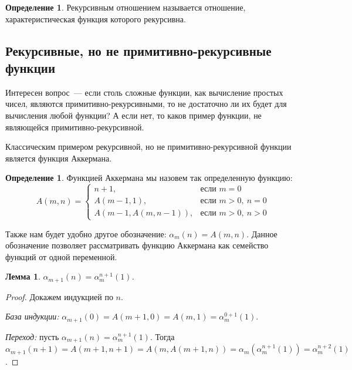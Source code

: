 \documentclass[a4paper,11pt]{article}
\newtheorem{lmm}[thm]{Лемма}
\theoremstyle{definition}
\newtheorem{dfn}[thm]{Определение}
\begin{document}
\begin{dfn}
Рекурсивным отношением называется отношение, характеристическая функция которого
рекурсивна.
\end{dfn}

\subsection{Рекурсивные, но не примитивно-рекурсивные функции}
Интересен вопрос~--- если столь сложные функции, как вычисление простых чисел,
являются примитивно-рекурсивными, то не достаточно ли их будет для вычисления
любой функции? А если нет, то каков пример функции, не являющейся
примитивно-рекурсивной.

Классическим примером рекурсивной, но не примитивно-рекурсивной функции является
функция Аккермана.

\begin{dfn}
Функцией Аккермана мы назовем так определенную функцию:
\[
A(m, n) =
\begin{cases}
n + 1, & \text{если } m = 0\\
A(m-1, 1), & \text{если } m > 0,\ n = 0\\
A(m-1, A(m, n-1)), & \text{если } m > 0,\ n > 0
\end{cases}
\]
\end{dfn}

Также нам будет удобно другое обозначение: $\alpha_m(n) = A(m, n)$. Данное
обозначение позволяет рассматривать функцию Аккермана как семейство функций от
одной переменной.

\begin{lmm}
$\alpha_{m+1}(n) = \alpha_m^{n+1}(1)$.
\end{lmm}
\begin{proof}
Докажем индукцией по $n$.

\emph{База индукции:} $\alpha_{m+1}(0) = A(m+1, 0) = A(m, 1) = \alpha_m^{0+1}(1)$.

\emph{Переход:} пусть $\alpha_{m+1}(n) = \alpha_m^{n+1}(1)$. Тогда
$\alpha_{m+1}(n+1) = A(m+1, n+1) = A(m, A(m+1, n)) = \alpha_m(\alpha_m^{n+1}(1))
= \alpha_m^{n+2}(1)$.
\end{proof}
\end{document}
